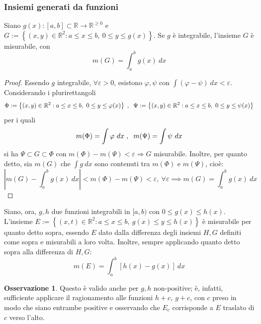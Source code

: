 \documentclass[10pt, a4paper]{scrartcl}
\theoremstyle{definition}
\numberwithin{esempio}{section}
\theoremstyle{definition}
\newtheorem{obs}{Osservazione}
\numberwithin{obs}{section}
\numberwithin{nota}{section}
\numberwithin{equation}{subsection}
\begin{document}
\subsubsection{Insiemi generati da funzioni}
Siano $g(x):\left[ a,b \right] \subset \mathbb{R} \to \mathbb{R}^{\ge 0}  $  e $G:= \left\{ (x,y) \in \mathbb{R}^2 : a\le x\le b , \ 0 \le  y \le  g(x) \right\}$. Se $g$ \`e integrabile, l'insieme $G$ \`e misurabile, con 
\begin{equation}
	m(G) = \int_{a} ^b g(x) \ dx
\end{equation}
\begin{proof}
	Essendo $g$ integrabile, $\forall \varepsilon >0$, esistono $\varphi ,\psi $ con $\int (\varphi -\psi ) \ dx < \varepsilon  $. Considerando i plurirettangoli 
	\[
		\Phi := \left\{ (x,y) \in \mathbb{R}^2 : a\le x\le b , \ 0\le  y \le \varphi (x) \right\} \hspace{.1cm} , \hspace{.2cm} \Psi := \left\{ (x,y) \in \mathbb{R}^2 : a\le x\le b , \ 0\le  y \le \psi (x) \right\}
	\] 
	per i quali
	\[
		m(\Phi) = \int \varphi  \ dx \hspace{.1cm} , \hspace{.2cm} m(\Psi) = \int \psi  \ dx 
	\] 
	si ha $\Psi \subset G \subset \Phi$ con $m(\Phi) - m(\Psi) < \varepsilon \Rightarrow G$ misurabile. 
	Inoltre, per quanto detto, sia $m(G)$ che $\int g \ dx$ sono contenuti tra $m(\Phi)$ e $m(\Psi)$, cio\`e:
	\[
	\left\lvert m(G) - \int_{a} ^b g(x) \ dx \right\rvert < m(\Phi) - m(\Psi)  < \varepsilon , \ \forall \varepsilon \implies m(G) = \int_{a} ^b g(x) \ dx
	\] 
	
\end{proof}
Siano, ora, $g,h$ due funzioni integrabili in $[a,b)$ con $0\le g(x) \le  h(x)$. L'insieme $E:=\left\{ (x,t) \in \mathbb{R}^2 : a\le x\le b, \ g(x) \le y \le h(x) \right\} $ \`e misurabile per quanto detto sopra, essendo $E$ dato dalla differenza degli insiemi $H,G$ definiti come sopra e misurabili a loro volta. Inoltre, sempre applicando quanto detto sopra alla differenza di $H,G$:
\[
m(E) = \int_{a} ^b \left[ h(x) - g(x) \right] \ dx 
\] 
\begin{obs}
	Questo \`e valido anche per $g,h$ non-positive; \`e, infatti, sufficiente applicare il ragionamento alle funzioni $h+c, \ g+c$, con $c$ preso in modo che siano entrambe positive e osservando che $E_c$ corrisponde a $E$ traslato di $c$ verso l'alto.
\end{obs}
\end{document}
